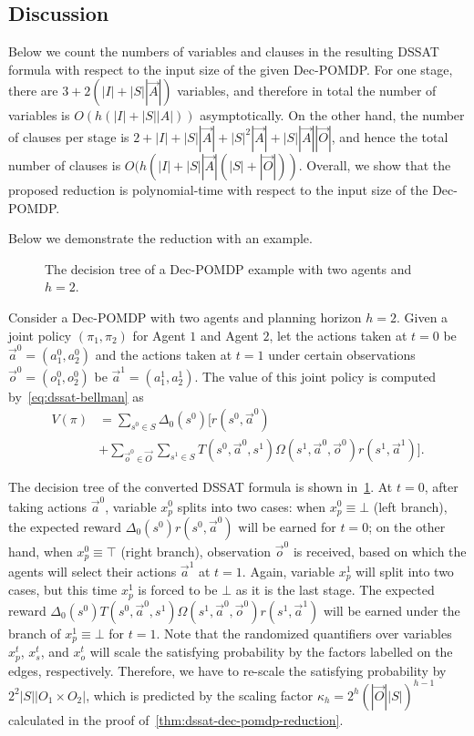 
\subsection{Discussion}
Below we count the numbers of variables and clauses in the resulting DSSAT formula with respect to the input size of the given Dec-POMDP.
For one stage, there are $3+2(|I|+|S||\vec{A}|)$ variables, and therefore in total the number of variables is $O(h(|I|+|S||A|))$ asymptotically.
On the other hand, the number of clauses per stage is $2+|I|+|S||\vec{A}|+|S|^2|\vec{A}|+|S||\vec{A}||\vec{O}|$, and hence the total number of clauses is $O(h(|I|+|S||\vec{A}|(|S|+|\vec{O}|))$.
Overall, we show that the proposed reduction is polynomial-time with respect to the input size of the Dec-POMDP.

Below we demonstrate the reduction with an example.

\begin{figure}[t]
    \centering
    
    \caption{The decision tree of a Dec-POMDP example with two agents and $h=2$.}
    \label{fig:dssat-dec-pomdp-example}
\end{figure}

\begin{example}
    Consider a Dec-POMDP with two agents and planning horizon $h=2$.
    Given a joint policy $(\pi_1,\pi_2)$ for Agent $1$ and Agent $2$, let the actions taken at $t=0$ be $\vec{a}^0=(a_1^0,a_2^0)$ and the actions taken at $t=1$ under certain observations $\vec{o}^0=(o_1^0,o_2^0)$ be $\vec{a}^1=(a_1^1,a_2^1)$.
    The value of this joint policy is computed by~\cref{eq:dssat-bellman} as
    \begin{align*}
        V(\pi) & =\sum_{s^0\in S}\Delta_0(s^0)[r(s^0,\vec{a}^0)                                                                  \\
               & +\sum_{\vec{o}^0\in\vec{O}}\sum_{s^1\in S}T(s^0,\vec{a}^0,s^1)\Omega(s^1,\vec{a}^0,\vec{o}^0)r(s^1,\vec{a}^1)].
    \end{align*}

    The decision tree of the converted DSSAT formula is shown in~\cref{fig:dssat-dec-pomdp-example}.
    At $t=0$, after taking actions $\vec{a}^0$, variable $x_p^0$ splits into two cases: when $x_p^0\equiv \bot$ (left branch), the expected reward $\Delta_0(s^0)r(s^0,\vec{a}^0)$ will be earned for $t=0$; on the other hand, when $x_p^0\equiv \top$ (right branch), observation $\vec{o}^0$ is received, based on which the agents will select their actions $\vec{a}^1$ at $t=1$.
    Again, variable $x_p^1$ will split into two cases, but this time $x_p^1$ is forced to be $\bot$ as it is the last stage.
    The expected reward $\Delta_0(s^0)T(s^0,\vec{a}^0,s^1)\Omega(s^1,\vec{a}^0,\vec{o}^0)r(s^1,\vec{a}^1)$ will be earned under the branch of $x_p^1\equiv\bot$ for $t=1$.
    Note that the randomized quantifiers over variables $x_p^t$, $x_s^t$, and $x_o^t$ will scale the satisfying probability by the factors labelled on the edges, respectively.
    Therefore, we have to re-scale the satisfying probability by $2^2|S||O_1\times O_2|$, which is predicted by the scaling factor $\kappa_{h}=2^h(|\vec{O}||S|)^{h-1}$ calculated in the proof of~\cref{thm:dssat-dec-pomdp-reduction}.
\end{example}